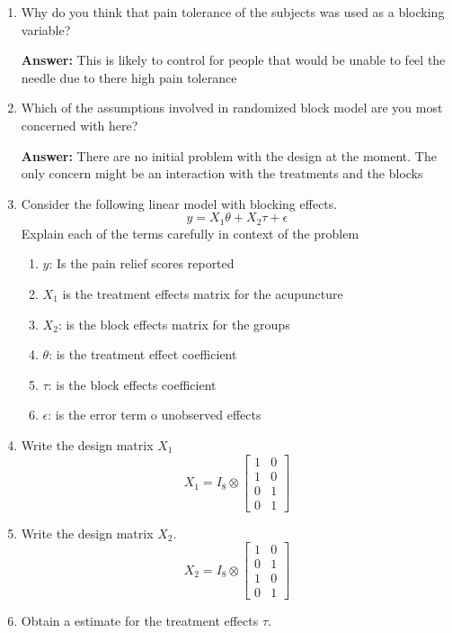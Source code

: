 \documentclass{article}
\begin{document}
\begin{enumerate}
	\item Why do you think that pain tolerance of the subjects was used as a blocking variable?

	      \textbf{Answer:} This is likely to control for people that would be unable to feel the needle due to there
	      high pain tolerance
	\item Which of the assumptions involved in randomized block model are you most concerned with here?

	      \textbf{Answer:} There are no initial problem with the design at the moment. The only concern might be an interaction with the treatments
	      and the blocks

	\item Consider the following linear model with blocking effects.
	      $$
		      y=X_1 \theta + X_2 \tau + \epsilon
	      $$
	      Explain each of the terms carefully in context of the problem
	      \begin{enumerate}
		      \item $y$: Is the pain relief scores reported
		      \item $X_1$ is the treatment effects matrix for the acupuncture
		      \item $X_2$: is the block effects matrix for the groups
		      \item $\theta$: is the treatment effect coefficient
		      \item $\tau$: is the block effects coefficient
		      \item $\epsilon$: is the error term o unobserved effects
	      \end{enumerate}
	\item Write the design matrix $X_1$
	      $$
		      X_1 = I_{8} \otimes \begin{bmatrix}
			      1 & 0 \\
			      1 & 0 \\
			      0 & 1 \\
			      0 & 1
		      \end{bmatrix}
	      $$

	\item Write the design matrix $X_2$.
	      $$
		      X_2 = I_{8} \otimes \begin{bmatrix}
			      1 & 0 \\
			      0 & 1 \\
			      1 & 0 \\
			      0 & 1
		      \end{bmatrix}
	      $$
	\item Obtain a estimate for the treatment effects $\hat{\tau}$.


\end{enumerate}
\end{document}
